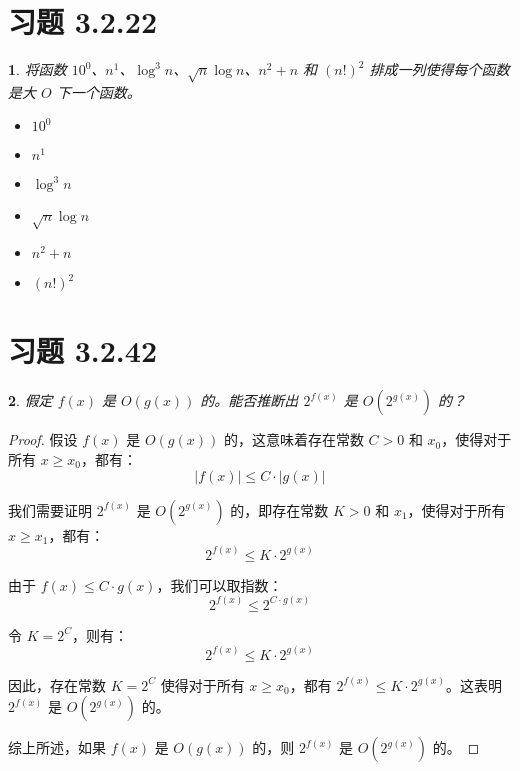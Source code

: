 \documentclass[UTF8]{report}
\theoremstyle{MyLineTheoremStyle} %
\theoremstyle{MyBlockTheoremStyle} %
\theoremstyle{MySubsubsectionStyle} %
\newtheorem{definition}{}
\begin{document}
\section{习题 3.2.22}

\begin{definition}
    将函数 \( 10^0 \)、\( n^1 \)、\( \log^3 n \)、\( \sqrt{n} \log n \)、\( n^2 + n \) 和 \( (n!)^2 \) 排成一列使得每个函数是大 \( O \) 下一个函数。
    \begin{itemize}
        \item \( 10^0 \)
        \item \( n^1 \)
        \item \( \log^3 n \)
        \item \( \sqrt{n} \log n \)
        \item \( n^2 + n \)
        \item \( (n!)^2 \)
    \end{itemize}
\end{definition}


\section{习题 3.2.42}

\begin{definition}
    假定 \( f(x) \) 是 \( O(g(x)) \) 的。能否推断出 \( 2^{f(x)} \) 是 \( O(2^{g(x)}) \) 的？
\end{definition}

\begin{proof}
    假设 \( f(x) \) 是 \( O(g(x)) \) 的，这意味着存在常数 \( C > 0 \) 和 \( x_0 \)，使得对于所有 \( x \geq x_0 \)，都有：
    \[
    |f(x)| \leq C \cdot |g(x)|
    \]

    我们需要证明 \( 2^{f(x)} \) 是 \( O(2^{g(x)}) \) 的，即存在常数 \( K > 0 \) 和 \( x_1 \)，使得对于所有 \( x \geq x_1 \)，都有：
    \[
    2^{f(x)} \leq K \cdot 2^{g(x)}
    \]

    由于 \( f(x) \leq C \cdot g(x) \)，我们可以取指数：
    \[
    2^{f(x)} \leq 2^{C \cdot g(x)}
    \]

    令 \( K = 2^C \)，则有：
    \[
    2^{f(x)} \leq K \cdot 2^{g(x)}
    \]

    因此，存在常数 \( K = 2^C \) 使得对于所有 \( x \geq x_0 \)，都有 \( 2^{f(x)} \leq K \cdot 2^{g(x)} \)。这表明 \( 2^{f(x)} \) 是 \( O(2^{g(x)}) \) 的。

    综上所述，如果 \( f(x) \) 是 \( O(g(x)) \) 的，则 \( 2^{f(x)} \) 是 \( O(2^{g(x)}) \) 的。
\end{proof}
\end{document}
